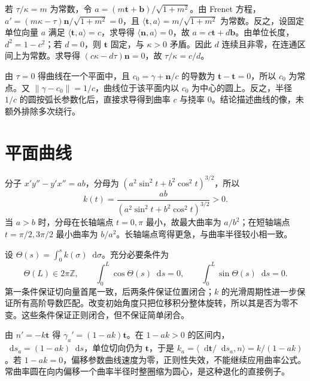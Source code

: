 \documentclass[UTF8,12pt,a4paper,fontset=fandol]{ctexbook}
\newcommand{\dd}{\mathop{}\!\mathrm d}
\newcommand{\ip}[2]{\langle #1,#2\rangle}
\newcommand{\norm}[1]{\lVert #1\rVert}
\begin{document}
\begin{solve}
若 $\tau/\kappa=m$ 为常数，令 $a=(m\mathbf t+\mathbf b)/\sqrt{1+m^2}$。由 Frenet 方程，$a'=(m\kappa-\tau)\mathbf n/\sqrt{1+m^2}=0$，且 $\ip{\mathbf t}a=m/\sqrt{1+m^2}$ 为常数。反之，设固定单位向量 $a$ 满足 $\ip{\mathbf t}a=c$，求导得 $\ip{\mathbf n}a=0$，故 $a=c\mathbf t+d\mathbf b$。由单位长度，$d^2=1-c^2$；若 $d=0$，则 $\mathbf t$ 固定，与 $\kappa>0$ 矛盾。因此 $d$ 连续且非零，在连通区间上为常数。求导得 $(c\kappa-d\tau)\mathbf n=0$，故 $\tau/\kappa=c/d$。
\end{solve}

\begin{solve}
由 $\tau=0$ 得曲线在一个平面中，且 $c_0=\gamma+\mathbf n/c$ 的导数为 $\mathbf t-\mathbf t=0$，所以 $c_0$ 为常点。又 $\norm{\gamma-c_0}=1/c$，曲线位于该平面内以 $c_0$ 为中心的圆上。反之，半径 $1/c$ 的圆按弧长参数化后，直接求导得到曲率 $c$ 与挠率 $0$。结论描述曲线的像，未额外排除多次绕行。
\end{solve}

\section{平面曲线}
\begin{solve}
分子 $x'y''-y'x''=ab$，分母为 $(a^2\sin^2t+b^2\cos^2t)^{3/2}$，所以
\[
 k(t)=\frac{ab}{(a^2\sin^2t+b^2\cos^2t)^{3/2}}>0.
\]
当 $a>b$ 时，分母在长轴端点 $t=0,\pi$ 最小，故最大曲率为 $a/b^2$；在短轴端点 $t=\pi/2,3\pi/2$ 最小曲率为 $b/a^2$。长轴端点弯得更急，与曲率半径较小相一致。
\end{solve}

\begin{solve}
设 $\Theta(s)=\int_0^s k(\sigma)\dd\sigma$。充分必要条件为
\[
 \Theta(L)\in2\pi\mathbb Z,\qquad
 \int_0^L\cos\Theta(s)\dd s=0,\qquad
 \int_0^L\sin\Theta(s)\dd s=0.
\]
第一条件保证切向量首尾一致，后两条件保证位置闭合；$k$ 的光滑周期性进一步保证所有高阶导数匹配。改变初始角度只把位移积分整体旋转，所以其是否为零不变。这些条件保证正则闭合，但不保证简单闭合。
\end{solve}

\begin{solve}
由 $n'=-k\mathbf t$ 得 $\gamma_a'=(1-ak)\mathbf t$。在 $1-ak>0$ 的区间内，$\dd s_a=(1-ak)\dd s$，单位切向仍为 $\mathbf t$，于是 $k_a=\ip{\dd\mathbf t/\dd s_a}n=k/(1-ak)$。若 $1-ak=0$，偏移参数曲线速度为零，正则性失效，不能继续应用曲率公式。常曲率圆在向内偏移一个曲率半径时整圈缩为圆心，是这种退化的直接例子。
\end{solve}
\end{document}
